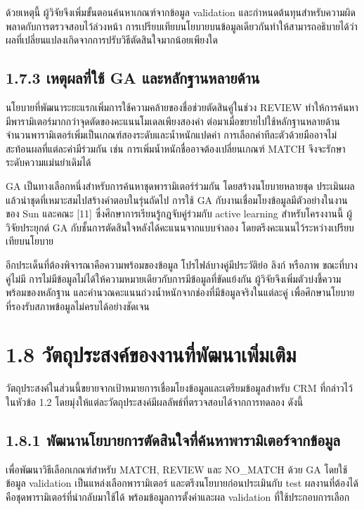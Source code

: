 \documentclass[12pt,a4paper]{report}
\begin{document}
ด้วยเหตุนี้ ผู้วิจัยจึงเพิ่มขั้นตอนค้นหาเกณฑ์จากข้อมูล validation และกำหนดต้นทุนสำหรับความผิดพลาดกับการตรวจสอบไว้ล่วงหน้า การเปรียบเทียบนโยบายบนข้อมูลเดียวกันทำให้สามารถอธิบายได้ว่าผลที่เปลี่ยนแปลงเกิดจากการปรับวิธีตัดสินใจมากน้อยเพียงใด

\subsection*{1.7.3 เหตุผลที่ใช้ GA และหลักฐานหลายด้าน}
นโยบายที่พัฒนาระยะแรกเพิ่มการใช้ความคล้ายของชื่อช่วยตัดสินคู่ในช่วง REVIEW ทำให้การค้นหามีพารามิเตอร์มากกว่าจุดตัดของคะแนนโมเดลเพียงสองค่า ต่อมาเมื่อขยายไปใช้หลักฐานหลายด้าน จำนวนพารามิเตอร์เพิ่มเป็นเกณฑ์สองระดับและน้ำหนักแปดค่า การเลือกค่าทีละตัวด้วยมืออาจไม่สะท้อนผลที่แต่ละค่ามีร่วมกัน เช่น การเพิ่มน้ำหนักชื่ออาจต้องเปลี่ยนเกณฑ์ MATCH จึงจะรักษาระดับความแม่นยำเดิมได้

GA เป็นทางเลือกหนึ่งสำหรับการค้นหาชุดพารามิเตอร์ร่วมกัน โดยสร้างนโยบายหลายชุด ประเมินผล แล้วนำชุดที่เหมาะสมไปสร้างคำตอบในรุ่นถัดไป การใช้ GA กับงานเชื่อมโยงข้อมูลมีตัวอย่างในงานของ Sun และคณะ [11] ซึ่งศึกษาการเรียนรู้กฎจับคู่ร่วมกับ active learning สำหรับโครงงานนี้ ผู้วิจัยประยุกต์ GA กับชั้นการตัดสินใจหลังได้คะแนนจากแบบจำลอง โดยตรึงคะแนนไว้ระหว่างเปรียบเทียบนโยบาย

อีกประเด็นที่ต้องพิจารณาคือความพร้อมของข้อมูล โปรไฟล์บางคู่มีประวัติย่อ ลิงก์ หรือภาพ ขณะที่บางคู่ไม่มี การไม่มีข้อมูลไม่ได้ให้ความหมายเดียวกับการมีข้อมูลที่ขัดแย้งกัน ผู้วิจัยจึงเพิ่มตัวบ่งชี้ความพร้อมของหลักฐาน และคำนวณคะแนนถ่วงน้ำหนักจากช่องที่มีข้อมูลจริงในแต่ละคู่ เพื่อศึกษานโยบายที่รองรับสภาพข้อมูลไม่ครบได้อย่างชัดเจน

\section*{1.8 วัตถุประสงค์ของงานที่พัฒนาเพิ่มเติม}
วัตถุประสงค์ในส่วนนี้ขยายจากเป้าหมายการเชื่อมโยงข้อมูลและเตรียมข้อมูลสำหรับ CRM ที่กล่าวไว้ในหัวข้อ 1.2 โดยมุ่งให้แต่ละวัตถุประสงค์มีผลลัพธ์ที่ตรวจสอบได้จากการทดลอง ดังนี้

\subsection*{1.8.1 พัฒนานโยบายการตัดสินใจที่ค้นหาพารามิเตอร์จากข้อมูล}
เพื่อพัฒนาวิธีเลือกเกณฑ์สำหรับ MATCH, REVIEW และ NO\_MATCH ด้วย GA โดยใช้ข้อมูล validation เป็นแหล่งเลือกพารามิเตอร์ และตรึงนโยบายก่อนประเมินกับ test ผลงานที่ต้องได้คือชุดพารามิเตอร์ที่นำกลับมาใช้ได้ พร้อมข้อมูลการตั้งค่าและผล validation ที่ใช้ประกอบการเลือก
\end{document}
